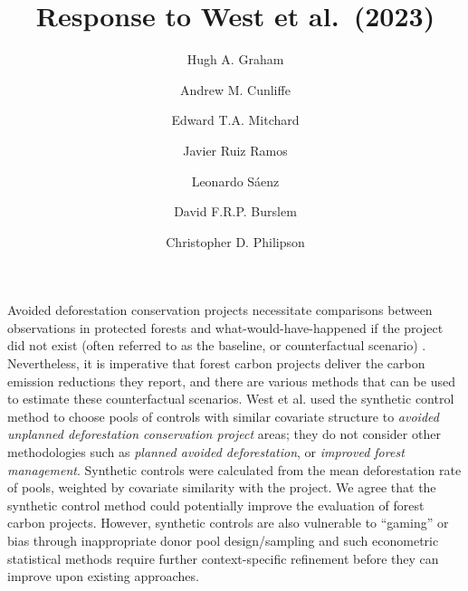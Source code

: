 \documentclass[
  number,
  3p]{elsarticle}
\begin{document}
\begin{frontmatter}
\title{Response to West et al.~(2023)}
\author[1,2]{Hugh A. Graham%
%
}
\author[2]{Andrew M. Cunliffe%
%
}

\author[3]{Edward T.A. Mitchard%
%
}

\author[1]{Javier Ruiz Ramos%
%
}

\author[1]{Leonardo Sáenz%
%
}

\author[4]{David F.R.P. Burslem%
%
}

\author[1]{Christopher D. Philipson%
%
}









        





\end{frontmatter}
    \ifdefined\Shaded\renewenvironment{Shaded}{\begin{tcolorbox}[borderline west={3pt}{0pt}{shadecolor}, boxrule=0pt, frame hidden, enhanced, sharp corners, breakable, interior hidden]}{\end{tcolorbox}}\fi

Avoided deforestation conservation projects necessitate comparisons
between observations in protected forests and what-would-have-happened
if the project did not exist (often referred to as the baseline, or
counterfactual scenario) \citep{balmford_realizing_2023}. Nevertheless,
it is imperative that forest carbon projects deliver the carbon emission
reductions they report, and there are various methods that can be used
to estimate these counterfactual scenarios. West et al.
\citep{west_action_2023} used the synthetic control method to choose
pools of controls with similar covariate structure to \emph{avoided
unplanned deforestation conservation project} areas; they do not
consider other methodologies such as \emph{planned avoided
deforestation}, or \emph{improved forest management}. Synthetic controls
were calculated from the mean deforestation rate of pools, weighted by
covariate similarity with the project. We agree that the synthetic
control method could potentially improve the evaluation of forest carbon
projects. However, synthetic controls are also vulnerable to ``gaming''
or bias through inappropriate donor pool design/sampling and such
econometric statistical methods require further context-specific
refinement \citep{balmford_realizing_2023} before they can improve upon
existing approaches.
\end{document}
